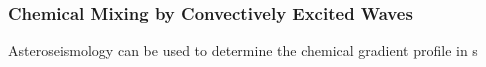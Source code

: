 {\color{purple}
\subsubsection{Chemical Mixing by Convectively Excited Waves}
}

Asteroseismology can be used to determine the chemical gradient profile in s

